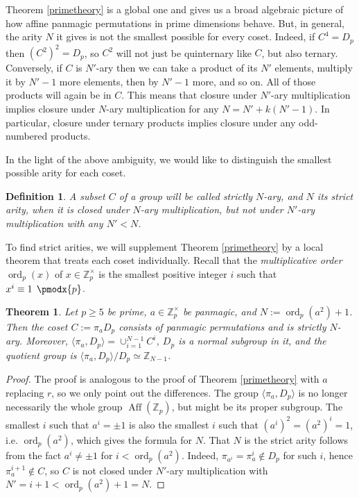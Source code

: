 \documentclass[11pt]{article}
\makeatletter
\renewcommand{\pmod}{%
  \allowbreak
  \if@display\mkern18mu\else\mkern8mu\fi
  \pmodx
}
\theoremstyle{plain}
\newtheorem{theorem}{Theorem}
\newtheorem{definition}{Definition}
\theoremstyle{definition}
\newcommand{\+}[1]{{#1}^\times}
\def\Aff{\operatorname{Aff}}
\DeclareMathOperator{\ord}{ord}
\def\Z{{\mathbb Z}}
\makeatother
\begin{document}
Theorem \ref{primetheory} is a global one and gives us a broad algebraic picture of how affine panmagic permutations in prime dimensions behave. But, in general, the arity $N$ it gives is not the smallest possible for every coset. Indeed, if $C^4=D_p$ then $(C^2)^2=D_p$, so $C^2$ will not just be quinternary like $C$, but also ternary. Conversely, if $C$ is $N'$-ary then we can take a product of its $N'$ elements, multiply it by $N'-1$ more elements, then by $N'-1$ more, and so on. All of those products will again be in $C$. This means that closure under $N'$-ary multiplication implies closure under $N$-ary multiplication for any $N=N'+k(N'-1)$. In particular, closure under ternary products implies closure under any odd-numbered products. 

In the light of the above ambiguity, we would like to distinguish the smallest possible arity for each coset.
\begin{definition} A subset $C$ of a group will be called strictly $N$-ary, and $N$ its strict arity, when it is closed under $N$-ary multiplication, but not under $N'$-ary multiplication with any $N'<N$. 
\end{definition}
\noindent To find strict arities, we will supplement Theorem \ref{primetheory} by a local theorem that treats each coset individually. Recall that the {\it multiplicative order} $\ord_p(x)$ of $x\in\Z_p^{\times}$ is the smallest positive integer $i$ such that $x^i\equiv1\pmod{p}$.
\begin{theorem}\label{primestrictarity} Let $p\geq5$ be prime, $a\in\Z_p^{\times}$ be panmagic, and $N:=\ord_p(a^2)+1$. Then the coset $C:=\pi_aD_p$ consists of panmagic permutations and is strictly $N$-ary. Moreover, 
$\langle\pi_a,D_p\rangle=\cup_{i=1}^{N-1}C^i$, $D_p$ is a normal subgroup in it, and the quotient group is $\langle\pi_a,D_p\rangle/D_p\simeq\Z_{N-1}$. 
\end{theorem}
\begin{proof}
The proof is analogous to the proof of Theorem \ref{primetheory} with $a$ replacing $r$, so we only point out the differences. The group $\langle\pi_a,D_p\rangle$ is no longer necessarily the whole group $\Aff(\Z_p)$, but might be its proper subgroup. The smallest $i$ such that $a^i=\pm1$ is also the smallest $i$ such that $(a^i)^2=(a^2)^i=1$, i.e. $\ord_p(a^2)$, which gives the formula for $N$. That $N$ is the strict arity follows from the fact $a^i\neq\pm1$ for $i<\ord_p(a^2)$. Indeed,  $\pi_{a^i}=\pi_a^i\not\in D_p$ for such $i$, hence $\pi_a^{i+1}\not\in C$, so $C$ is not closed under $N'$-ary multiplication with $N'=i+1<\ord_p(a^2)+1=N$.
\end{proof}
\end{document}
